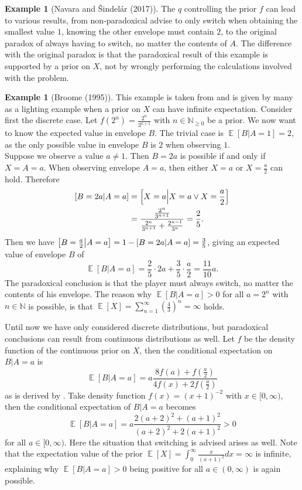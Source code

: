 \documentclass[a4paper]{report}
\theoremstyle{plain}
\theoremstyle{definition}
\newtheorem{example}[theorem]{Example}
\theoremstyle{remark}
\numberwithin{equation}{chapter}
\newcommand{\N}{\mathbb{N}}
\let\P\relax
\DeclareMathOperator{\P}{\mathbb{P}}
\DeclareMathOperator{\E}{\mathbb{E}}
\DeclareMathOperator{\1}{\mathbbm{1}}
\begin{document}
\begin{example}[Navara and Šindelár (2017)]
The $q$ controlling the prior $f$ can lead to various results, from non-paradoxical advise to only switch when obtaining the smallest value $1$, knowing the other envelope must contain $2$, to the original paradox of always having to switch, no matter the contents of $A$. The difference with the original paradox is that the paradoxical result of this example is supported by a prior on $X$, not by wrongly performing the calculations involved with the problem.
\end{example}

\begin{example}[Broome (1995)]
This example is taken from \cite{Broome95} and is given by many as a lighting example when a prior on $X$ can have infinite expectation. Consider first the discrete case. Let $f(2^n)=\frac{2^n}{3^{n+1}}$ with $n\in\N_{\geq 0}$ be a prior. We now want to know the expected value in envelope $B$. The trivial case is $\E[B|A=1]=2$, as the only possible value in envelope $B$ is $2$ when observing $1$.\\
Suppose we observe a value $a\neq1$. Then $B=2a$ is possible if and only if $X=A=a$. When observing envelope $A=a$, then either $X=a$ or $X=\frac{a}{2}$ can hold. Therefore
\begin{align}
\P[B=2a|A=a]&=\P\left[X=a\middle|X=a\lor X=\frac{a}{2}\right]\\
&=\frac{\frac{2^n}{3^{n+1}}}{\frac{2^n}{3^{n+1}}+\frac{2^{n-1}}{3^{n}}}=\frac{2}{5}.
\end{align}
Then we have $\P\left[B=\frac{a}{2}\middle|A=a\right]=1-\P[B=2a|A=a]=\frac{3}{5}$, giving an expected value of envelope $B$ of
\begin{equation}
\E[B|A=a]=\frac{2}{5}\cdot2a+\frac{3}{5}\cdot\frac{a}{2}=\frac{11}{10}a.
\end{equation}
The paradoxical conclusion is that the player must always switch, no matter the contents of his envelope. The reason why $\E[B|A=a]>0$ for all $a=2^n$ with $n\in\N$ is possible, is that $\E[X]=\sum_{n=1}^\infty\left(\frac{4}{3}\right)^n=\infty$ holds.

Until now we have only considered discrete distributions, but paradoxical conclusions can result from continuous distributions as well. Let $f$ be the density function of the continuous prior on $X$, then the conditional expectation on $B|A=a$ is
\begin{equation}
\E[B|A=a]=a\frac{8f(a)+f\left(\frac{a}{2}\right)}{4f(x)+2f\left(\frac{a}{2}\right)}
\end{equation}
as is derived by \cite{Broome95}. Take density function $f(x)=(x+1)^{-2}$ with $x\in[0,\infty)$, then the conditional expectation of $B|A=a$ becomes
\begin{equation}
\E[B|A=a]=a\frac{2(a+2)^2+(a+1)^2}{(a+2)^2+2(a+1)^2}>0
\end{equation}
for all $a\in[0,\infty)$. Here the situation that switching is advised arises as well. Note that the expectation value of the prior $\E[X]=\int_0^\infty \frac{x}{(x+1)^2}dx=\infty$ is infinite, explaining why $\E[B|A=a]>0$ being positive for all $a\in(0,\infty)$ is again possible.
\end{example}
\end{document}
